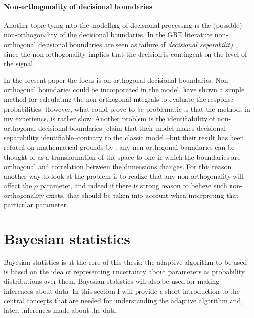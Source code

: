 \documentclass{article}\usepackage{knitr}
\begin{document}
\paragraph{Non-orthogonality of decisional boundaries}

Another topic tying into the modelling of decisional processing is the (possible) non-orthogonality of the decisional boundaries. In the GRT literature non-orthogonal decisional boundaries are seen as failure of \textit{decisional separability} \citep{ashby2015}, since the non-orthogonality implies that the decision is contingent on the level of the signal. 

In the present paper the focus is on orthogonal decisional boundaries. Non-orthogonal boundaries could be incorporated in the model, \cite{ennis2003} have shown a simple method for calculating the non-orthogonal integrals to evaluate the response probabilities. However, what could prove to be problematic is that the method, in my experience, is rather slow.  Another problem is the identifiability of non-orthogonal decisional boundaries: \cite{soto2015} claim that their model makes decisional separability identifiable--contrary to the classic model \citep{silbert2013}--but their result has been refuted on mathematical grounds by \cite{silbert2016}: any non-orthogonal boundaries can be thought of as a transformation of the space to one in which the boundaries are orthogonal and correlation between the dimensions changes. For this reason another way to look at the problem is to realize that any non-orthogonality will affect the $\rho$ parameter, and indeed if there is strong reason to believe such non-orthogonality exists, that should be taken into account when interpreting that particular parameter.  

\newpage


\section{Bayesian statistics}
\label{sec:bayes}

Bayesian statistics is at the core of this thesis: the adaptive algorithm to be used is based on the idea of representing uncertainty about parameters as probability distributions over them. Bayesian statistics will also be used for making inferences about data. In this section I will provide a short introduction to the central concepts that are needed for understanding the adaptive algorithm and, later, inferences made about the data. 
\end{document}
